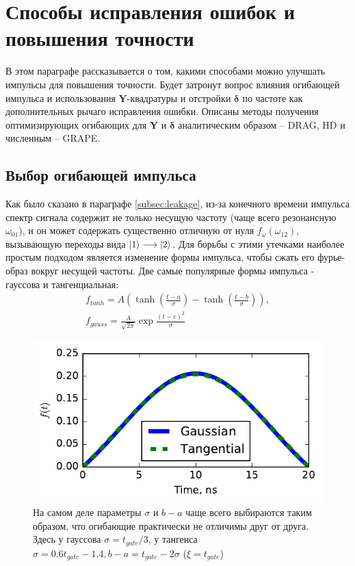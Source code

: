 \documentclass[12pt, twoside]{report}
\DeclarePairedDelimiter\ket{\lvert}{\rangle}
\numberwithin{equation}{section}
\numberwithin{figure}{section}
\begin{document}
\section{Способы исправления ошибок и повышения точности}
В этом параграфе рассказывается о том, какими способами можно улучшать импульсы для повышения точности. Будет затронут вопрос влияния огибающей импульса и использования $\mathbf{Y}$-квадратуры и отстройки $\mathbf{\delta}$ по частоте как дополнительных рычаго исправления ошибки. Описаны методы получения оптимизирующих огибающих для $\mathbf{Y}$ и $\mathbf{\delta}$ аналитическим образом -- DRAG, HD и численным -- GRAPE.
\subsection{Выбор огибающей импульса}
Как было сказано в параграфе \ref{subsec:leakage}, из-за конечного времени импульса спектр сигнала содержит не только несущую частоту (чаще всего резонансную $\omega_{01}$), и он может содержать существенно отличную от нуля $f_\omega \left( \omega_{12} \right)$, вызывающую переходы вида $\ket{1} \longrightarrow \ket{2}$. Для борьбы с этими утечками наиболее простым подходом является изменение формы импульса, чтобы сжать его фурье-образ вокруг несущей частоты. Две самые популярные формы импульса - гауссова и тангенциальная:
\begin{gather}
f_{tanh} = A \left( \tanh \left( \frac{t-a}{\sigma} \right) - \tanh \left( \frac{t-b}{\sigma} \right) \right), \label{pulse:tanh} \\
f_{gauss} = \frac{A}{\sqrt{2 \pi}}  \exp\frac{ \left( t - c\right)^2}{\sigma} \label{pulse:gauss}
\end{gather} 

\begin{figure}
\includegraphics[width = 0.6 \textwidth ]{Pictures2/gaussian-tanh-cut-sample}
\caption{На самом деле параметры $\sigma$ и $b-a$ чаще всего выбираются таким образом, что огибающие практически не отличимы друг от друга. Здесь у гауссова $\sigma = t_{gate}/3$, у тангенса $\sigma = 0.6 t_{gate} - 1.4, b-a = t_{gate} - 2\sigma$ ($\xi = t_{gate}$)}
\label{fig:gaussian-tanh-envelope}
\end{figure}
\end{document}
